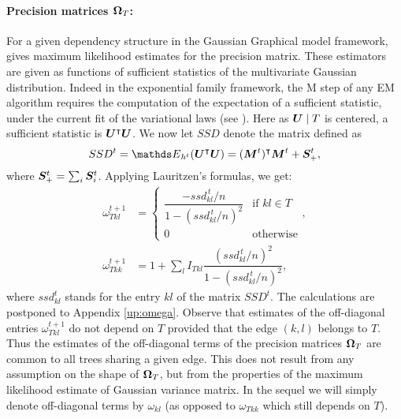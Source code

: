 \paragraph{Precision matrices ${\boldsymbol{\Omega}}_T$:}
For a given dependency structure in the Gaussian Graphical model framework, \cite{Lau96} gives maximum likelihood estimates for the precision matrix. 
These estimators are given as functions of sufficient statistics of the multivariate Gaussian distribution. Indeed in the exponential family framework, the M step of any EM algorithm requires the computation of the expectation of a sufficient statistic, under the current fit of the variational laws (see \citet{mclachlan}). Here as ${\boldsymbol{U}} \mid T$ is centered, a sufficient statistic is ${\boldsymbol{U}}^\intercal {\boldsymbol{U}}$. We now let $SSD$ denote the matrix defined as 
$$
SSD^t = \Esp_{h^t} (\Ubf^\intercal \Ubf) = (\Mbf^t)^\intercal \Mbf^t + \Sbf^t_+,
$$
where ${\boldsymbol{S}}^t_+ = \sum_i {\boldsymbol{S}}^t_i$. Applying Lauritzen's formulas, we get:
\begin{align} \label{omegaT}
\omega^{t+1}_{Tkl} & = \left\{
\begin{array}{ll}
\dfrac{ -ssd_{kl}^{\,t}/n}{1-(ssd_{kl}^{\,t}/n)^2} & \text{if } kl \in T \\
0 & \text{otherwise}
\end{array} 
\right., \\
\omega^{t+1}_{Tkk} & = 1 + \sum_l I_{Tkl} \dfrac{(ssd_{kl}^{\,t}/n)^2}{1-(ssd_{kl}^{\,t}/n)^2},
\nonumber
\end{align}
where $ssd^t_{kl}$ stands for the entry $kl$ of the matrix $SSD^t$.
The calculations are postponed to Appendix \ref{up:omega}. Observe that estimates of the off-diagonal entries $\omega^{t+1}_{Tkl}$ do not depend on $T$ provided that the edge $(k, l)$ belongs to $T$.  Thus the estimates of the off-diagonal terms of the precision matrices ${\boldsymbol{\Omega}}_T$ are common to all trees sharing a given edge. This does not result from any assumption on the shape of  ${\boldsymbol{\Omega}}_T$, but from the properties of the maximum likelihood estimate of Gaussian variance matrix. In the sequel we will simply denote off-diagonal terms by $\omega_{kl}$ (as opposed to $\omega_{Tkk}$ which still depends on $T$).\\

